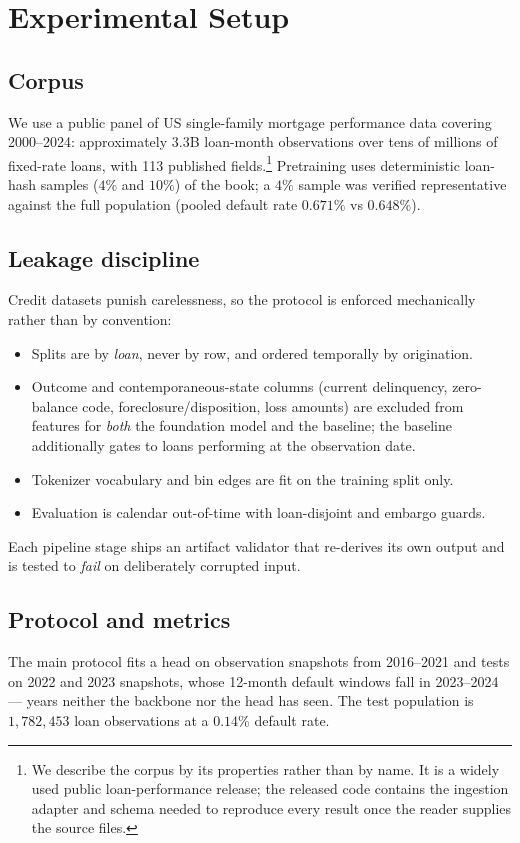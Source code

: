 \documentclass[10pt,letterpaper]{article}
\begin{document}
\section{Experimental Setup}
\label{sec:setup}

\subsection{Corpus}
We use a public panel of US single-family mortgage performance data covering 2000--2024:
approximately $3.3$B loan-month observations over tens of millions of fixed-rate loans, with 113
published fields.\footnote{We describe the corpus by its properties rather than by name. It is a
widely used public loan-performance release; the released code contains the ingestion adapter and
schema needed to reproduce every result once the reader supplies the source files.} Pretraining
uses deterministic loan-hash samples ($4\%$ and $10\%$) of the book; a $4\%$ sample was verified
representative against the full population (pooled default rate $0.671\%$ vs $0.648\%$).

\subsection{Leakage discipline}
Credit datasets punish carelessness, so the protocol is enforced mechanically rather than by
convention:
\begin{itemize}
  \item Splits are by \emph{loan}, never by row, and ordered temporally by origination.
  \item Outcome and contemporaneous-state columns (current delinquency, zero-balance code,
        foreclosure/disposition, loss amounts) are excluded from features for \emph{both} the
        foundation model and the baseline; the baseline additionally gates to loans performing at
        the observation date.
  \item Tokenizer vocabulary and bin edges are fit on the training split only.
  \item Evaluation is calendar out-of-time with loan-disjoint and embargo guards.
\end{itemize}
Each pipeline stage ships an artifact validator that re-derives its own output and is tested to
\emph{fail} on deliberately corrupted input.

\subsection{Protocol and metrics}
The main protocol fits a head on observation snapshots from 2016--2021 and tests on 2022 and 2023
snapshots, whose 12-month default windows fall in 2023--2024 --- years neither the backbone nor the
head has seen. The test population is $1{,}782{,}453$ loan observations at a $0.14\%$ default rate.
\end{document}
